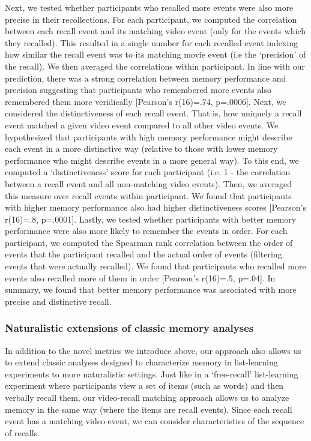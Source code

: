 \documentclass[a4paper,man,natbib,floatsintext]{apa6}
\begin{document}
Next, we tested whether participants who recalled more events were also more precise in their recollections. For each participant, we computed the correlation between each recall event and its matching video event (only for the events which they recalled). This resulted in a single number for each recalled event indexing how similar the recall event was to its matching movie event (i.e the `precision' of the recall). We then averaged the correlations within participant. In line with our prediction, there was a strong correlation between memory performance and precision suggesting that participants who remembered more events also remembered them more veridically [Pearson's r(16)=.74, p=.0006]. Next, we considered the distinctiveness of each recall event. That is, how uniquely a recall event matched a given video event compared to all other video events. We hypothesized that participants with high memory performance might describe each event in a more distinctive way (relative to those with lower memory performance who might describe events in a more general way). To this end, we computed a `distinctiveness' score for each participant (i.e. 1 - the correlation between a recall event and all non-matching video events).  Then, we averaged this measure over recall events within participant.  We found that participants with higher memory performance also had higher distinctiveness scores [Pearson's r(16)=.8, p=.0001]. Lastly, we tested whether participants with better memory performance were also more likely to remember the events in order.  For each participant, we computed the Spearman rank correlation between the order of events that the participant recalled and the actual order of events (filtering events that were actually recalled).  We found that participants who recalled more events also recalled more of them in order [Pearson's r(16)=.5, p=.04]. In summary, we found that better memory performance was associated with more precise and distinctive recall.


\subsubsection{Naturalistic extensions of classic memory analyses}
In addition to the novel metrics we introduce above, our approach also allows us to extend classic analyses designed to characterize memory in list-learning experiments to more naturalistic settings. Just like in a `free-recall' list-learning experiment where participants view a set of items (such as words) and then verbally recall them, our video-recall matching approach allows us to analyze memory in the same way (where the items are recall events). Since each recall event has a matching video event, we can consider characteristics of the sequence of recalls.
\end{document}
